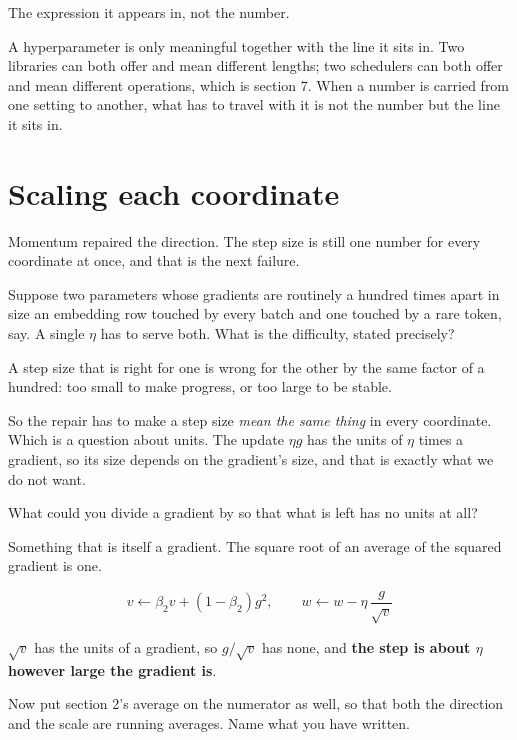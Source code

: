 \begin{fr}
\begin{ansblock}
The expression it appears in, not the number.
\end{ansblock}

A hyperparameter is only meaningful together with the line it sits in. Two
libraries can both offer  and mean different
lengths; two schedulers can both offer  and mean different
operations, which is section 7. When a number is carried from one setting to
another, what has to travel with it is not the number but the line it sits in.
\end{fr}

\section{Scaling each coordinate}
\label{sec:P20-adaptive}

\begin{fr}
Momentum repaired the direction. The step size is still one number for every
coordinate at once, and that is the next failure.

Suppose two parameters whose gradients are routinely a hundred times apart in
size \dash{} an embedding row touched by every batch and one touched by a rare
token, say. A single $\eta$ has to serve both. What is the difficulty, stated
precisely?
\dotline
\nextframe
\end{fr}

\begin{fr}
\begin{ansblock}
A step size that is right for one is wrong for the other by the same factor of
a hundred: too small to make progress, or too large to be stable.
\end{ansblock}

So the repair has to make a step size \emph{mean the same thing} in every
coordinate. Which is a question about units. The update $\eta g$ has the units
of $\eta$ times a gradient, so its size depends on the gradient's size, and
that is exactly what we do not want.

What could you divide a gradient by so that what is left has no units at all?
\nextframe
\end{fr}

\begin{fr}
\begin{ansblock}
Something that is itself a gradient. The square root of an average of the
squared gradient is one.
\end{ansblock}

\[ v \leftarrow \beta_2 v + (1-\beta_2) g^{2}, \qquad
   w \leftarrow w - \eta\,\frac{g}{\sqrt{v}} \]

$\sqrt{v}$ has the units of a gradient, so $g/\sqrt{v}$ has none, and
\textbf{the step is about $\eta$ however large the gradient is}.

Now put section 2's average on the numerator as well, so that both the
direction and the scale are running averages. Name what you have written.
\dotline
\nextframe
\end{fr}

